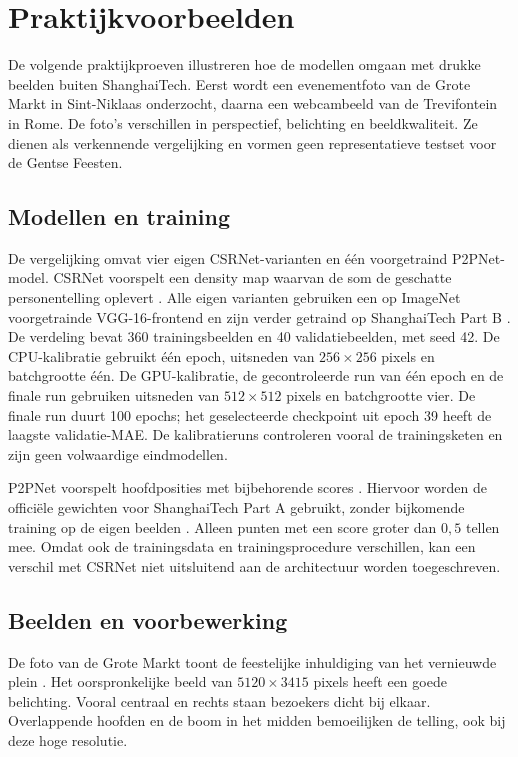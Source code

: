 \clearpage
\section{Praktijkvoorbeelden}
\label{sec:voorbeeld-grote-markt}

De volgende praktijkproeven illustreren hoe de modellen omgaan met drukke beelden buiten ShanghaiTech. Eerst wordt een evenementfoto van de Grote Markt in Sint-Niklaas onderzocht, daarna een webcambeeld van de Trevifontein in Rome. De foto's verschillen in perspectief, belichting en beeldkwaliteit. Ze dienen als verkennende vergelijking en vormen geen representatieve testset voor de Gentse Feesten.

\subsection{Modellen en training}

De vergelijking omvat vier eigen CSRNet-varianten en één voorgetraind P2PNet-model. CSRNet voorspelt een density map waarvan de som de geschatte personentelling oplevert \autocite{Li2018}. Alle eigen varianten gebruiken een op ImageNet voorgetrainde VGG-16-frontend en zijn verder getraind op ShanghaiTech Part B \autocite{Zhang2016}. De verdeling bevat 360 trainingsbeelden en 40 validatiebeelden, met seed 42. De CPU-kalibratie gebruikt één epoch, uitsneden van \(256 \times 256\) pixels en batchgrootte één. De GPU-kalibratie, de gecontroleerde run van één epoch en de finale run gebruiken uitsneden van \(512 \times 512\) pixels en batchgrootte vier. De finale run duurt 100 epochs; het geselecteerde checkpoint uit epoch 39 heeft de laagste validatie-MAE. De kalibratieruns controleren vooral de trainingsketen en zijn geen volwaardige eindmodellen.

P2PNet voorspelt hoofdposities met bijbehorende scores \autocite{Song2021}. Hiervoor worden de officiële gewichten voor ShanghaiTech Part A gebruikt, zonder bijkomende training op de eigen beelden \autocite{P2PNetRepository}. Alleen punten met een score groter dan \(0{,}5\) tellen mee. Omdat ook de trainingsdata en trainingsprocedure verschillen, kan een verschil met CSRNet niet uitsluitend aan de architectuur worden toegeschreven.

\subsection{Beelden en voorbewerking}

De foto van de Grote Markt toont de feestelijke inhuldiging van het vernieuwde plein \autocite{SintNiklaas2026GroteMarkt}. Het oorspronkelijke beeld van \(5120 \times 3415\) pixels heeft een goede belichting. Vooral centraal en rechts staan bezoekers dicht bij elkaar. Overlappende hoofden en de boom in het midden bemoeilijken de telling, ook bij deze hoge resolutie.

